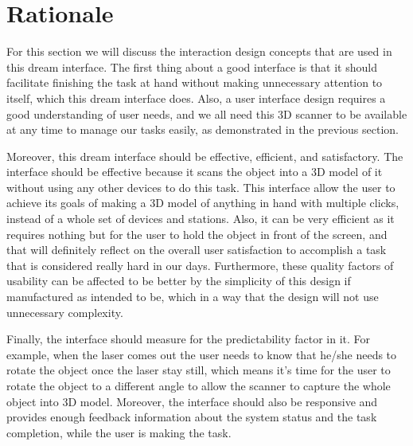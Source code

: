\documentclass[12pt, oneside]{amsart}   	%
\begin{document}
\section{Rationale}

For this section we will discuss the interaction design concepts that are used in this dream interface. The first thing about a good interface is that it should facilitate finishing the task at hand without making unnecessary attention to itself, which this dream interface does. Also, a user interface design requires a good understanding of user needs, and we all need this 3D scanner to be available at any time to manage our tasks easily, as demonstrated in the previous section. 

Moreover, this dream interface should be effective, efficient, and satisfactory.
The interface should be effective because it scans the object into a 3D model of it without using any other devices to do this task. This interface allow the user to achieve its goals of making a 3D model of anything in hand with multiple clicks, instead of a whole set of devices and stations.  Also, it can be very efficient as it requires nothing but for the user to hold the object in front of the screen, and that will definitely reflect on the overall user satisfaction to accomplish a task that is considered really hard in our days.  Furthermore, these quality factors of usability can be affected to be better by the simplicity of this design if manufactured as intended to be, which in a way that the design will not use unnecessary complexity. 

Finally, the interface should measure for the predictability factor in it.  For example, when the laser comes out the user needs to know that he/she needs to rotate the object once the laser stay still, which means it's time for the user to rotate the object to a different angle to allow the scanner to capture the whole object into 3D model.
Moreover, the interface should also be responsive and provides enough feedback information about the system status and the task completion, while the user is making the task.
\end{document}

